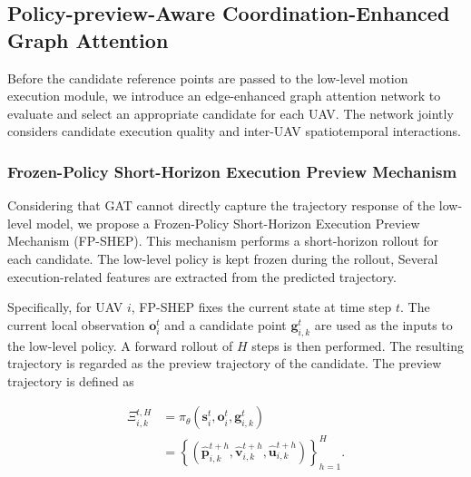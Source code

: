 

\subsection{Policy-preview-Aware Coordination-Enhanced Graph Attention}

Before the candidate reference points are passed to the low-level motion execution module, we introduce an edge-enhanced graph attention network to evaluate and select an appropriate candidate for each UAV. The network jointly considers candidate execution quality and inter-UAV spatiotemporal interactions.

\subsubsection{Frozen-Policy Short-Horizon Execution Preview Mechanism}

Considering that GAT cannot directly capture the trajectory response of the low-level model, we propose a Frozen-Policy Short-Horizon Execution Preview Mechanism (FP-SHEP). This mechanism performs a short-horizon rollout for each candidate. The low-level policy is kept frozen during the rollout, Several execution-related features are extracted from the predicted trajectory. 

Specifically, for UAV $i$, FP-SHEP fixes the current state at time step $t$. The current local observation $\mathbf{o}_i^t$ and a candidate point $\mathbf g_{i,k}^t$ are used as the inputs to the low-level policy. A forward rollout of $H$ steps is then performed. The resulting trajectory is regarded as the preview trajectory of the candidate. The preview trajectory is defined as

\begin{equation}
    \label{eq:preview_dynamics}
    \begin{aligned}
        \Xi_{i,k}^{t,H}
        &=
        \pi_{\theta}
        \left(
        \mathbf{s}_i^t,
        \mathbf{o}_i^t,
        \mathbf{g}_{i,k}^t
        \right) \\
        &=
        \left\{
        \left(
        \hat{\mathbf{p}}_{i,k}^{t+h},
        \hat{\mathbf{v}}_{i,k}^{t+h},
        \hat{\mathbf{u}}_{i,k}^{t+h}
        \right)
        \right\}_{h=1}^{H}.
    \end{aligned}
\end{equation}


